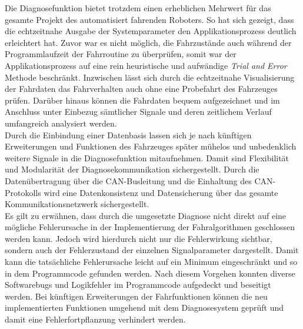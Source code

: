 Die Diagnosefunktion bietet trotzdem einen erheblichen Mehrwert für das gesamte Projekt des automatisiert fahrenden Roboters. So hat sich gezeigt, dass die echtzeitnahe Ausgabe der Systemparameter den Applikationsprozess deutlich erleichtert hat. Zuvor war es nicht möglich, die Fahrzustände auch während der Programmlaufzeit der Fahrroutine zu überprüfen, somit war der Applikationsprozess auf eine rein heuristische und aufwändige \emph{Trial and Error} Methode beschränkt. Inzwischen lässt sich durch die echtzeitnahe Visualisierung der Fahrdaten das Fahrverhalten auch ohne eine Probefahrt des Fahrzeuges prüfen. Darüber hinaus können die Fahrdaten bequem aufgezeichnet und im Anschluss unter Einbezug sämtlicher Signale und deren zeitlichem Verlauf umfangreich analysiert werden.\\
Durch die Einbindung einer Datenbasis lassen sich je nach künftigen Erweiterungen und Funktionen des Fahrzeuges später mühelos und unbedenklich weitere Signale in die Diagnosefunktion mitaufnehmen. Damit sind Flexibilität und Modularität der Diagnosekommunikation sichergestellt. Durch die Datenübertragung über die CAN-Busleitung und die Einhaltung des CAN-Protokolls wird eine Datenkonsistenz und Datensicherung über das gesamte Kommunikationsnetzwerk sichergestellt.\\
Es gilt zu erwähnen, dass durch die umgesetzte Diagnose nicht direkt auf eine mögliche Fehlerursache in der Implementierung der Fahralgorithmen geschlossen werden kann. Jedoch wird hierdurch nicht nur die Fehlerwirkung sichtbar, sondern auch der Fehlerzustand der einzelnen Signalparameter dargestellt. Damit kann die tatsächliche Fehlerursache leicht auf ein Minimum eingeschränkt und so in dem Programmcode gefunden werden. Nach diesem Vorgehen konnten diverse Softwarebugs und Logikfehler im Programmcode aufgedeckt und beseitigt werden. Bei künftigen Erweiterungen der Fahrfunktionen können die neu implementierten Funktionen umgehend mit dem Diagnosesystem geprüft und damit eine Fehlerfortpflanzung verhindert werden. 

